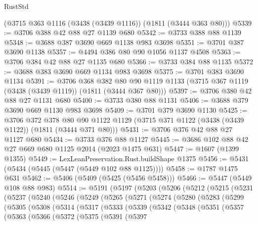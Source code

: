 \begin{lexlean}{RustStd}
\begin{coremodule}
    (@3715 @363 @1116 (@3438 (@3439 @1116)) (@1811 (@3444 @363 @80)))
@5339 := @3706 @388 @42 @88 @27 @1139 @680
@5342 := @3733 @388 @88 @1139
@5348 := @3688 @387 @3690 @669 @1138 @983 @3698
@5351 := @3701 @387 @3690 @1138
@5357 := @4494 @386 @80 @90 @1056 @1137 @4508
@5363 := @3706 @384 @42 @88 @27 @1135 @680
@5366 := @3733 @384 @88 @1135
@5372 := @3688 @383 @3690 @669 @1134 @983 @3698
@5375 := @3701 @383 @3690 @1134
@5391 := @3706
    @368
    @382
    @80
    @90
    @1119
    @1133
    (@3715 @367 @1119 (@3438 (@3439 @1119)) (@1811 (@3444 @367 @80)))
@5397 := @3706 @380 @42 @88 @27 @1131 @680
@5400 := @3733 @380 @88 @1131
@5406 := @3688 @379 @3690 @669 @1130 @983 @3698
@5409 := @3701 @379 @3690 @1130
@5425 := @3706
    @372
    @378
    @80
    @90
    @1122
    @1129
    (@3715 @371 @1122 (@3438 (@3439 @1122)) (@1811 (@3444 @371 @80)))
@5431 := @3706 @376 @42 @88 @27 @1127 @680
@5434 := @3733 @376 @88 @1127
@5445 := @3686 @102 @88 @42 @27 @669 @680 @1125 @2014 (@2023 @1475 @631)
@5447 := @1607 (@1399 @1355)
@5449 := LexLeanPreservation.Rust.buildShape @1375
@5456 := @5431 (@5434 (@5445 (@5447 (@5449 @102 @88 @1125))))
@5458 := @1787 @1475 @631
@5462 := @5406 (@5409 (@5425 (@5456 @5458)))
@5466 := @5447 (@5449 @108 @88 @983)
@5514 := @5191
    (@5197
      (@5203
        (@5206
          (@5212
            (@5215
              (@5231
                (@5237
                  (@5240
                    (@5246
                      (@5249
                        (@5265
                          (@5271
                            (@5274
                              (@5280
                                (@5283
                                  (@5299
                                    (@5305
                                      (@5308
                                        (@5314
                                          (@5317
                                            (@5333
                                              (@5339
                                                (@5342
                                                  (@5348
                                                    (@5351
                                                      (@5357
                                                        (@5363
                                                          (@5366
                                                            (@5372
                                                              (@5375
                                                                (@5391
                                                                  (@5397

\end{coremodule}
\end{lexlean}
